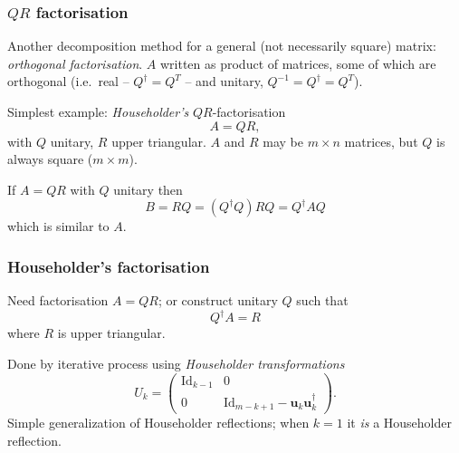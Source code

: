 \documentclass{beamer}
\newcommand{\bfm}[1]{{\boldsymbol{#1}}}
\begin{document}
\begin{frame}
  \frametitle{\texorpdfstring{$QR$ factorisation}{QR factorisation}}

  Another decomposition method for a general (not necessarily square)
  matrix: \emph{orthogonal factorisation}. $A$ written as product of
  matrices, some of which are orthogonal (i.e.\ real -- $Q^{\dagger} =
  Q^T$ -- and unitary, $Q^{-1} = Q^{\dagger} = Q^T$).  \pause

  \vspace{1ex}

  Simplest example: \emph{Householder's} $QR$-factorisation
  \begin{equation*}
    A = Q R,
  \end{equation*}
  with $Q$ unitary, $R$ upper triangular. \pause $A$ and $R$ may be $m
  \times n$ matrices, but $Q$ is always square ($m \times m$). \pause

  \vspace{1ex}

  If $A = QR$ with $Q$ unitary then
  \begin{equation*}
    B = R Q = \left( Q^{\dagger} Q \right) R Q = Q^{\dagger} A Q
  \end{equation*}
  which is similar to $A$.

\end{frame}

\begin{frame}
  \frametitle{Householder's factorisation}

  Need factorisation $A = QR$; or construct unitary $Q$ such that
  \begin{equation*}
    Q^{\dagger} A = R
  \end{equation*}
  where $R$ is upper triangular. \pause

  \vspace{1ex}

  Done by iterative process using \emph{Householder transformations}
  \begin{equation*}
    U_k =
    \begin{pmatrix}
      \text{Id}_{k-1} & 0 \\
      0 & \text{Id}_{m-k+1} - \bfm{u}_k \bfm{u}_k^{\dagger}
    \end{pmatrix}.
  \end{equation*} \pause
  Simple generalization of Householder reflections;
  when $k=1$ it \emph{is} a Householder reflection.

\end{frame}
\end{document}
